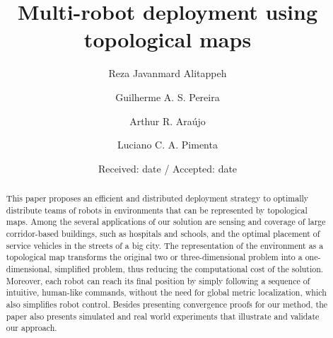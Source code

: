 \documentclass[smallcondensed]{svjour3}
\begin{document}
\title{Multi-robot deployment using topological maps}



\author{Reza Javanmard Alitappeh \and Guilherme A. S. Pereira \and Arthur R. Ara\'ujo \and Luciano C. A. Pimenta  }



\date{Received: date / Accepted: date}

\maketitle

\begin{abstract}
\sloppy
This paper proposes an efficient and distributed deployment strategy to optimally distribute teams of robots in environments that can be represented by topological maps. Among the several applications of our solution are sensing and coverage of large corridor-based buildings, such as hospitals and schools, and the optimal placement of service vehicles in the streets of a big city. The representation of the environment as a topological map transforms the original two or three-dimensional problem into a one-dimensional, simplified problem, thus reducing the computational cost of the solution. Moreover, each robot can reach its final position by simply following a sequence of intuitive, human-like commands, without the need for global metric localization, which also simplifies robot control. Besides presenting convergence proofs for our method, the paper also presents simulated and real world experiments that illustrate and validate our approach.

\end{abstract}
\end{document}
